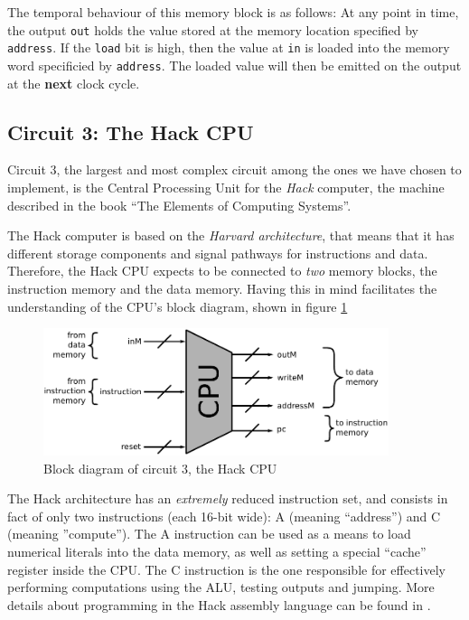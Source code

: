 \documentclass[a4paper]{article}
\begin{document}
            The temporal behaviour of this memory block is as follows: At any point in time, the
            output \texttt{out} holds the value stored at the memory location specified by
            \texttt{address}.  If the \texttt{load} bit is high, then the value at \texttt{in} is
            loaded into the memory word specificied by \texttt{address}. The loaded value will then
            be emitted on the output at the \textbf{next} clock cycle.

        \subsection{Circuit 3: The Hack CPU}
        \label{subsec:hack-cpu-circuit}
            Circuit 3, the largest and most complex circuit among the ones we have chosen to
            implement, is the Central Processing Unit for the \emph{Hack} computer, the machine
            described in the book ``The Elements of Computing Systems''\cite{nand2tetris-book}.

            The Hack computer is based on the \emph{Harvard architecture}, that means that it has
            different storage components and signal pathways for instructions and data. Therefore,
            the Hack CPU expects to be connected to \emph{two} memory blocks, the instruction memory
            and the data memory. Having this in mind facilitates the understanding of the CPU's
            block diagram, shown in figure \ref{fig:cpu-block}
            \begin{figure}[h!]
                \begin{center}
                    \includegraphics[width=0.9\textwidth]{imgs/cpu-block.pdf}
                \end{center}
                \caption{Block diagram of circuit 3, the Hack CPU
                    \label{fig:cpu-block}}
            \end{figure}

            The Hack architecture has an \emph{extremely} reduced instruction set, and consists in
            fact of only two instructions (each 16-bit wide): A (meaning ``address'') and
            C (meaning ''compute''). The A instruction can be used as a means to load numerical
            literals into the data memory, as well as setting a special ``cache'' register inside
            the CPU. The C instruction is the one responsible for effectively performing
            computations using the ALU, testing outputs and jumping. More details about programming
            in the Hack assembly language can be found in \cite{nand2tetris-chapter-assembly}.
\end{document}
